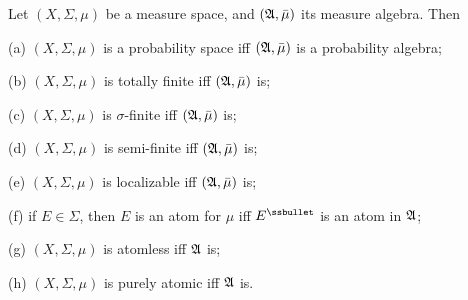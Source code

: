  Let $(X,\Sigma,\mu)$ be a measure space, and
$(\frak A,\bar\mu)$ its measure algebra.   Then

(a) $(X,\Sigma,\mu)$ is a probability space iff $(\frak A,\bar\mu)$ is
a probability algebra;

(b) $(X,\Sigma,\mu)$ is totally finite iff $(\frak A,\bar\mu)$ is;

(c) $(X,\Sigma,\mu)$ is $\sigma$-finite iff $(\frak A,\bar\mu)$ is;

(d) $(X,\Sigma,\mu)$ is semi-finite iff $(\frak A,\bar\mu)$ is;

(e) $(X,\Sigma,\mu)$ is localizable iff $(\frak A,\bar\mu)$ is;

(f) if $E\in\Sigma$, then $E$ is an atom for $\mu$ iff $E^{\ssbullet}$
is an atom in $\frak A$;

(g) $(X,\Sigma,\mu)$ is atomless iff $\frak A$ is;

(h) $(X,\Sigma,\mu)$ is purely atomic iff $\frak A$ is.

